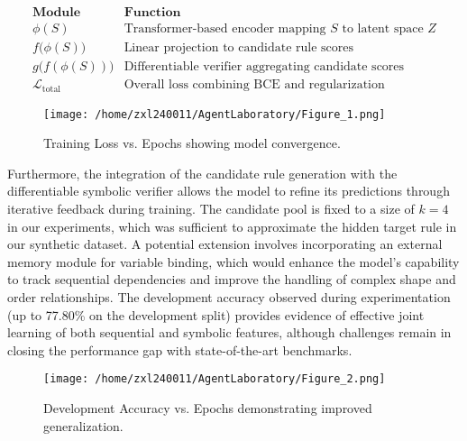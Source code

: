 \documentclass{article}
\begin{document}
\[
\begin{array}{ll}
\textbf{Module}       & \textbf{Function} \\
\hline
\phi(S)               & \text{Transformer-based encoder mapping } S \text{ to latent space } Z \\
f\big(\phi(S)\big)     & \text{Linear projection to candidate rule scores} \\
g\big(f(\phi(S))\big)  & \text{Differentiable verifier aggregating candidate scores} \\
\mathcal{L}_{\text{total}} & \text{Overall loss combining BCE and regularization}
\end{array}
\]

\begin{figure}[h]
\caption{Training Loss vs. Epochs showing model convergence.}
\centering
\texttt{[image: /home/zxl240011/AgentLaboratory/Figure\_1.png]}
\label{fig:fig1}
\end{figure}

Furthermore, the integration of the candidate rule generation with the differentiable symbolic verifier allows the model to refine its predictions through iterative feedback during training. The candidate pool is fixed to a size of \(k=4\) in our experiments, which was sufficient to approximate the hidden target rule in our synthetic dataset. A potential extension involves incorporating an external memory module for variable binding, which would enhance the model's capability to track sequential dependencies and improve the handling of complex shape and order relationships. The development accuracy observed during experimentation (up to 77.80\% on the development split) provides evidence of effective joint learning of both sequential and symbolic features, although challenges remain in closing the performance gap with state-of-the-art benchmarks.

\begin{figure}[h]
\caption{Development Accuracy vs. Epochs demonstrating improved generalization.}
\centering
\texttt{[image: /home/zxl240011/AgentLaboratory/Figure\_2.png]}
\label{fig:fig2}
\end{figure}
\end{document}
